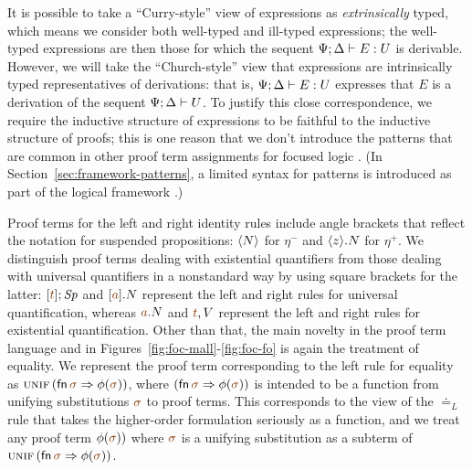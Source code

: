 It is possible to take a ``Curry-style''
view of expressions as {\it extrinsically} typed, which means we
consider both well-typed and ill-typed expressions; the well-typed
expressions are then those for which the sequent
${\Psi}; {\Delta} \vdash {E} : {U}$ is derivable. However, we will take the
``Church-style'' view that expressions are intrinsically typed
representatives of derivations: that is, ${\Psi}; {\Delta} \vdash {E} : {U}$
expresses that $E$ is a derivation of the sequent
${\Psi};{\Delta} \vdash {U} \mathstrut$. To justify this close correspondence, we
require the inductive structure of expressions to be faithful to the
inductive structure of proofs; this is one reason that we
don't introduce the patterns that are common in other proof term
assignments for focused logic
\cite{watkins02concurrent,licata08focusing,krishnaswami09focusing}.
(In Section~\ref{sec:framework-patterns}, a limited syntax for patterns
is introduced as part of the logical framework \sls.)

Proof terms for the left and right identity rules include angle
brackets that reflect the notation for suspended propositions:
$\langle {N} \rangle$ for $\eta^-$ and $\langle {z} \rangle . {N}$ for $\eta^+$. We
distinguish proof terms dealing with existential quantifiers from those
dealing with universal quantifiers in a nonstandard way by using
square brackets for the latter: $\tforalll{\lf t}{\Sp}$ and
$\tforallr{\lf a}{N}$ represent the left and right rules for universal
quantification, whereas $\texistsl{\lf a}{N}$ and $\texistsr{\lf
  t}{V}$ represent the left and right rules for existential
quantification. Other than that, the main novelty in the proof term
language and in Figures~\ref{fig:foc-mall}-\ref{fig:foc-fo} is again
the treatment of equality.  We represent the proof term corresponding
to the left rule for equality as ${\textsc{unif}}\,({\sf
  fn}\,\lf{\sigma} \Rightarrow \phi(\lf\sigma))$, where $({\sf
  fn}\,\lf{\sigma} \Rightarrow \phi(\lf\sigma))$ is intended to be a
function from unifying substitutions $\lf\sigma$ to proof terms. This
corresponds to the view of the $\doteq_L$ rule that takes the
higher-order formulation seriously as a function, and we treat any
proof term $\phi(\lf\sigma))$ where $\lf\sigma$ is a unifying
substitution as a subterm of ${\textsc{unif}}\,({\sf fn}\,\lf{\sigma}
\Rightarrow \phi(\lf\sigma))$.

